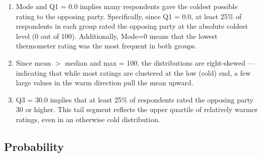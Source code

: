 \documentclass{article}
\begin{document}
\begin{enumerate}
\begin{enumerate}
    \item Mode and Q1 = 0.0 implies many respondents gave the coldest possible rating to the opposing party. Specifically, since Q1 = 0.0, at least 25\% of respondents in each group rated the opposing party at the absolute coldest level (0 out of 100). Additionally, Mode=0 means that the lowest thermometer rating was the most frequent in both groups.

    \item Since mean $>$ median and max = 100, the distributions are right-skewed — indicating that while most ratings are clustered at the low (cold) end, a few large values in the warm direction pull the mean upward.

    \item Q3 = 30.0 implies that at least 25\% of respondents rated the opposing party 30 or higher. This tail segment reflects the upper quartile of relatively warmer ratings, even in an otherwise cold distribution.
  \end{enumerate}


\end{enumerate}


\subsection{Probability}
\end{document}

